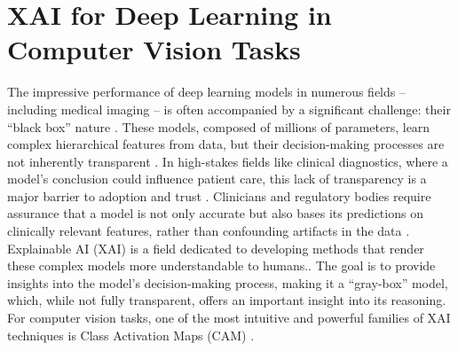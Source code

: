 \section{XAI for Deep Learning in Computer Vision Tasks}
The impressive performance of deep learning models in numerous fields -- including medical imaging -- is often accompanied by a significant challenge: their ``black box'' nature \cite{chaddad2023survey, singh2025beyond}. These models, composed of millions of parameters, learn complex hierarchical features from data, but their decision-making processes are not inherently transparent \cite{moradi2024model}. In high-stakes fields like clinical diagnostics, where a model's conclusion could influence patient care, this lack of transparency is a major barrier to adoption and trust \cite{chaddad2023survey,glikson2020human}. Clinicians and regulatory bodies require assurance that a model is not only accurate but also bases its predictions on clinically relevant features, rather than confounding artifacts in the data \cite{kingma2017adam}.
Explainable AI (XAI) is a field dedicated to developing methods that render these complex models more understandable to humans.\cite{chaddad2023survey,kinger2024review}. The goal is to provide insights into the model's decision-making process, making it a ``gray-box'' model, which, while not fully transparent, offers an important insight into its reasoning. For computer vision tasks, one of the most intuitive and powerful families of XAI techniques is Class Activation Maps (CAM) \cite{minh2023overview}.



